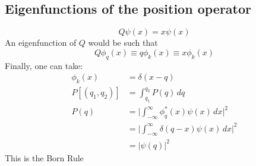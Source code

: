 \documentclass[a4paper,11pt,normalem]{article}
\begin{document}
\subsection{Eigenfunctions of the position operator}\label{eigenfunctions-of-the-position-operator}

\[
    Q\psi(x) = x\psi(x)
\]
An eigenfunction of \(Q\) would be such that
\[
    Q\phi_q(x) \equiv q\phi_k(x) \equiv x\phi_k(x)
\]
Finally, one can take:
\[
    \begin{aligned}
    \phi_k(x) &= \delta(x-q) \\
    P[(q_1,q_2)] &= \int_{q_1}^{q_2} P(q)\,dq \\
    P(q) &= \Bigg|\int_{-\infty}^{\infty} \phi_q^* (x)\psi(x)\,dx\Bigg|^2 \\
    &= \Bigg|\int_{-\infty}^{\infty} \delta(q-x)\psi(x)\,dx\Bigg|^2 \\
    &= |\psi(q)|^2
    \end{aligned}
\]
This is the Born Rule
\end{document}
